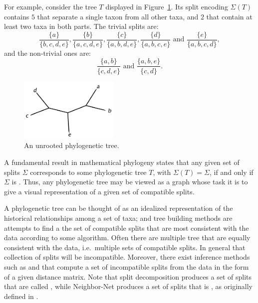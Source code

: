 \documentclass[11pt]{article}
\begin{document}
For example, consider the tree $T$ displayed in Figure~\ref{fig:splitsexample}.
Its split encoding $\Sigma(T)$ contains $5$ 
that separate a single taxon from all other taxa, and $2$
 that contain at least two taxa in both parts.
The trivial splits are:
$$
\frac{\{a\}}{\{b,c,d,e\}},
\frac{\{b\}}{\{a,c,d,e\}},
\frac{\{c\}}{\{a,b,d,e\}},
\frac{\{d\}}{\{a,b,c,e\}} \mbox{~and~}
\frac{\{e\}}{\{a,b,c,d\}},
$$
and the non-trivial ones are:
$$
\frac{\{a,b\}}{\{c,d,e\}} \mbox{~and~}
\frac{\{a,b,e\}}{\{c,d\}}.
$$

\begin{figure}[ht]
\begin{center}
\includegraphics[height=3cm]{splitsexample.pdf}
\end{center}
\caption{An unrooted phylogenetic tree.}\label{fig:splitsexample}
\end{figure}

A fundamental result in mathematical phylogeny states that
any given set of splits $\Sigma$ corresponds to some phylogenetic tree $T$,
with $\Sigma(T)=\Sigma$, if and only if $\Sigma$ is
 \cite{buneman.dist}.
Thus, any phylogenetic tree may be viewed as a graph whose task it
is to give a visual representation of a given set of compatible splits.


A phylogenetic tree can be thought of as an idealized representation of the
historical relationships among a set of taxa; and tree building methods are
attempts to find a the set of compatible splits that are most consistent with
the data according to some algorithm.  Often there are multiple tree that are
equally consistent with the data, i.e.\ multiple sets of compatible splits.  In
general that collection of splits will be incompatible.  Moreover, there exist
inference methods such as  and
 that compute a
set of incompatible splits from the data in the form of a given distance
matrix.  Note that split decomposition produces a set of splits that are called
, while Neighbor-Net produces a set of splits that
is , as originally defined in \cite{BandeltDress92}.
\end{document}
